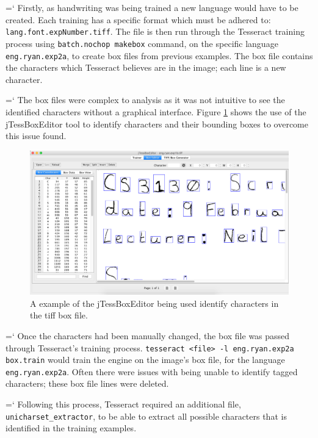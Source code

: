 {{\ttfamily \hyphenchar\the\font=`\-}%
Firstly, as handwriting was being trained a new language would have to be created. Each training has a specific format which must be adhered to: \texttt{lang.font.expNumber.tiff}. The file is then run through the Tesseract training process using \texttt{batch.nochop makebox} command, on the specific language \texttt{eng.ryan.exp2a}, to create box files from previous examples. The box file contains the characters which Tesseract believes are in the image; each line is a new character.

{{\ttfamily \hyphenchar\the\font=`\-}%
The box files were complex to analysis as it was not intuitive to see the identified characters without a graphical interface. Figure \ref{fig:box_editor} shows the use of the jTessBoxEditor \cite{citeulike:13926798} tool to identify characters and their bounding boxes to overcome this issue found.

\begin{figure}[H]
  \centering
  \includegraphics[width=\textwidth]{images/box_editor}
  \caption{A example of the jTessBoxEditor being used identify characters in the tiff box file.}
  \label{fig:box_editor}
\end{figure}

{{\ttfamily \hyphenchar\the\font=`\-}%
Once the characters had been manually changed, the box file was passed through Tesseract's training process. \texttt{tesseract <file> -l eng.ryan.exp2a box.train} would train the engine on the image's box file, for the language \texttt{eng.ryan.exp2a}. Often there were issues with being unable to identify tagged characters; these box file lines were deleted.

{{\ttfamily \hyphenchar\the\font=`\-}%
Following this process, Tesseract required an additional file, \texttt{unicharset\_extractor}, to be able to extract all possible characters that is identified in the training examples.

}}}}
